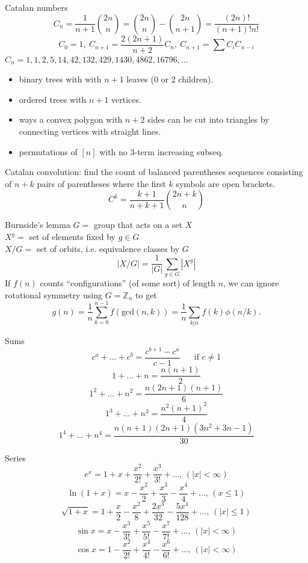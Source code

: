 \begin{misc}{Catalan numbers}
	\[ C_n=\frac{1}{n+1}\binom{2n}{n}= \binom{2n}{n}-\binom{2n}{n+1} = \frac{(2n)!}{(n+1)!n!} \]
	\[ C_0=1,\ C_{n+1} = \frac{2(2n+1)}{n+2}C_n,\ C_{n+1}=\sum C_iC_{n-i} \]
	${C_n = 1, 1, 2, 5, 14, 42, 132, 429, 1430, 4862, 16796, \dots}$
	\begin{itemize}[noitemsep,leftmargin=*]
		\item binary trees with with $n+1$ leaves (0 or 2 children).
		\item ordered trees with $n+1$ vertices.
		\item ways a convex polygon with $n+2$ sides can be cut into triangles by connecting vertices with straight lines.
		\item permutations of $[n]$ with no 3-term increasing subseq.
	\end{itemize}
	Catalan convolution: find the count of balanced parentheses sequences consisting of $n+k$ pairs of parentheses where the first $k$ symbols are open brackets.
	\[ C^k=\frac{k+1}{n+k+1}\binom{2n+k}{n}\]
\end{misc}

\begin{misc}{Burnside's lemma}
	$G =$ group that acts on a set $X$ \\
	$X^g =$ set of elements fixed by $g \in G$ \\
	$X/G =$ set of orbits, i.e. equivalence classes by $G$
	$$|X/G| = \frac{1}{|G|} \sum_{g \in G} |X^g|$$
	If $f(n)$ counts ``configurations'' (of some sort) of length $n$, we can ignore rotational symmetry using $G = \mathbb Z_n$ to get
	$$g(n) = \frac 1 n \sum_{k=0}^{n-1}{f(\text{gcd}(n, k))} = \frac 1 n \sum_{k|n}{f(k)\phi(n/k)}.$$
\end{misc}

\begin{misc}{Sums}
	$$c^a + \ldots + c^b = \frac{c^{b+1} - c^a}{c-1} \text{~~~~~if } c \neq 1$$
	$$1 + \ldots + n = \frac{n(n+1)}{2}$$
	$$1^2 + \ldots + n^2 = \frac{n(2n+1)(n+1)}{6}$$
	$$1^3 + \ldots + n^3 = \frac{n^2(n+1)^2}{4}$$
	$$1^4 + \ldots + n^4 = \frac{n(n+1)(2n+1)(3n^2+3n-1)}{30}$$
\end{misc}

\begin{misc}{Series}
	$$e^x = 1+x+\frac{x^2}{2!}+\frac{x^3}{3!}+\dots,\,(|x|<\infty)$$
	$$\ln(1+x) = x-\frac{x^2}{2}+\frac{x^3}{3}-\frac{x^4}{4}+\dots,\,(x\leq1)$$
	$$\sqrt{1+x} = 1+\frac{x}{2}-\frac{x^2}{8}+\frac{2x^3}{32}-\frac{5x^4}{128}+\dots,\,(|x|\leq1)$$
	$$\sin x = x-\frac{x^3}{3!}+\frac{x^5}{5!}-\frac{x^7}{7!}+\dots,\,(|x|<\infty)$$
	$$\cos x = 1-\frac{x^2}{2!}+\frac{x^4}{4!}-\frac{x^6}{6!}+\dots,\,(|x|<\infty)$$
\end{misc}

